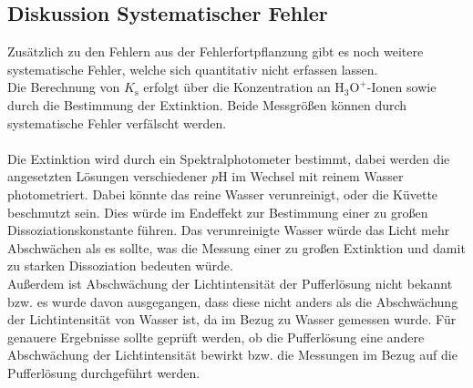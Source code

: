 \documentclass[12pt,a4paper,titlepage,headinclude,bibtotoc]{scrartcl}
\begin{document}
\subsection{Diskussion Systematischer Fehler}
Zusätzlich zu den Fehlern aus der Fehlerfortpflanzung gibt es noch weitere systematische Fehler, welche sich quantitativ nicht erfassen lassen.\\
Die Berechnung von $K_{\mathrm{s}}$ erfolgt über die Konzentration an $\mathrm{H_3 O^+}$-Ionen sowie durch die Bestimmung der Extinktion. Beide Messgrößen können durch systematische Fehler verfälscht werden.\\\\
Die Extinktion wird durch ein Spektralphotometer bestimmt, dabei werden die angesetzten Lösungen verschiedener $p$H im Wechsel mit reinem Wasser photometriert. Dabei könnte das reine Wasser verunreinigt, oder die Küvette beschmutzt sein. Dies würde im Endeffekt zur Bestimmung einer zu großen Dissoziationskonstante führen. Das verunreinigte Wasser würde das Licht mehr Abschwächen als es sollte, was die Messung einer zu großen Extinktion und damit  zu starken Dissoziation bedeuten würde.\\
Außerdem ist Abschwächung der Lichtintensität der Pufferlösung nicht bekannt bzw. es wurde davon ausgegangen, dass diese nicht anders als die Abschwächung der Lichtintensität von Wasser ist, da im Bezug zu Wasser gemessen wurde. Für genauere Ergebnisse sollte geprüft werden, ob die Pufferlösung eine andere Abschwächung der Lichtintensität bewirkt bzw. die Messungen im Bezug auf die Pufferlösung durchgeführt werden.\\
\end{document}
